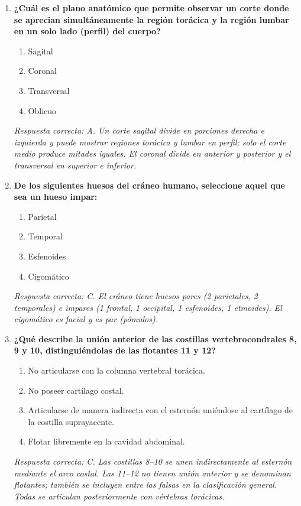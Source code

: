 \begin{enumerate}[label=\textbf{\arabic*.}]
    \item \textbf{¿Cuál es el plano anatómico que permite observar un corte donde se aprecian simultáneamente la región torácica y la región lumbar en un solo lado (perfil) del cuerpo?}
    \begin{enumerate}
        \item[A)] Sagital
        \item[B)] Coronal
        \item[C)] Transversal
        \item[D)] Oblicuo
    \end{enumerate}
    \textit{Respuesta correcta: A. Un corte sagital divide en porciones derecha e izquierda y puede mostrar regiones torácica y lumbar en perfil; solo el corte medio produce mitades iguales. El coronal divide en anterior y posterior y el transversal en superior e inferior.}

    \item \textbf{De los siguientes huesos del cráneo humano, seleccione aquel que sea un hueso impar:}
    \begin{enumerate}
        \item[A)] Parietal
        \item[B)] Temporal
        \item[C)] Esfenoides
        \item[D)] Cigomático
    \end{enumerate}
    \textit{Respuesta correcta: C. El cráneo tiene huesos pares (2 parietales, 2 temporales) e impares (1 frontal, 1 occipital, 1 esfenoides, 1 etmoides). El cigomático es facial y es par (pómulos).}

    \item \textbf{¿Qué describe la unión anterior de las costillas vertebrocondrales 8, 9 y 10, distinguiéndolas de las flotantes 11 y 12?}
    \begin{enumerate}
        \item[A)] No articularse con la columna vertebral torácica.
        \item[B)] No poseer cartílago costal.
        \item[C)] Articularse de manera indirecta con el esternón uniéndose al cartílago de la costilla suprayacente.
        \item[D)] Flotar libremente en la cavidad abdominal.
    \end{enumerate}
    \textit{Respuesta correcta: C. Las costillas 8--10 se unen indirectamente al esternón mediante el arco costal. Las 11--12 no tienen unión anterior y se denominan flotantes; también se incluyen entre las falsas en la clasificación general. Todas se articulan posteriormente con vértebras torácicas.}


\end{enumerate}
